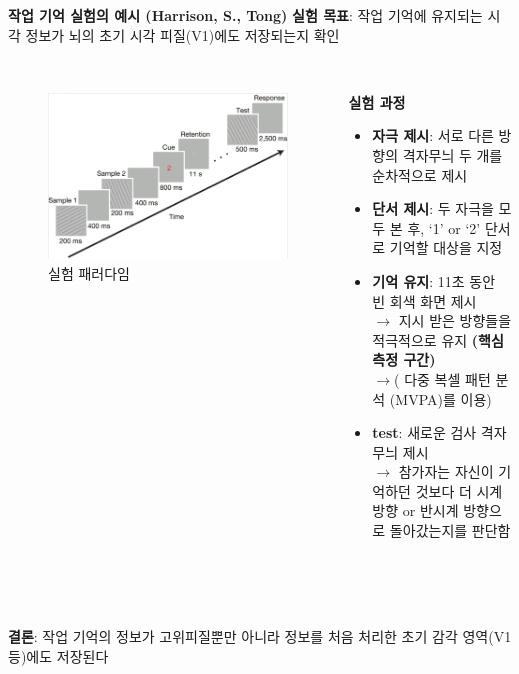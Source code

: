 \documentclass{beamer}
\begin{document}
\begin{frame}{\textbf{작업 기억 실험의 예시 (Harrison, S., Tong)}}
  \textbf{실험 목표}: 작업 기억에 유지되는 시각 정보가 뇌의 초기 시각 피질(V1)에도 저장되는지 확인\\~\\

  \begin{columns}
    \begin{column}{0.38\textwidth}
      \centering
      \begin{figure}
        \centering
        \includegraphics[width=\textwidth]{image/Harrison}
        \caption{실험 패러다임}
      \end{figure}
    \end{column}
    \hfill
    \begin{column}{0.62\textwidth}
      \textbf{실험 과정}
      \vspace{-0.5em}
      \begin{itemize}
        \setlength{\itemsep}{0em}
        \setlength{\parskip}{0em}
        \item \textbf{자극 제시}: 서로 다른 방향의 격자무늬 두 개를 순차적으로 제시
        \item \textbf{단서 제시}: 두 자극을 모두 본 후, `1' or `2' 단서로 기억할 대상을 지정
        \item \textbf{기억 유지}: 11초 동안 빈 회색 화면 제시\\
          $\rightarrow$ 지시 받은 방향들을 적극적으로 유지 \textbf{(핵심 측정 구간)}\\
          $\rightarrow$( 다중 복셀 패턴 분석 (MVPA)를 이용)
        \item \textbf{test}: 새로운 검사 격자무늬 제시\\
          $\rightarrow$ 참가자는 자신이 기억하던 것보다 더 시계 방향 or 반시계 방향으로 돌아갔는지를 판단함
      \end{itemize}
    \end{column}
  \end{columns}\\~\\~\\

  \textbf{결론}: 작업 기억의 정보가 고위피질뿐만 아니라 정보를 처음 처리한 초기 감각 영역(V1 등)에도 저장된다
\end{frame}
\end{document}

